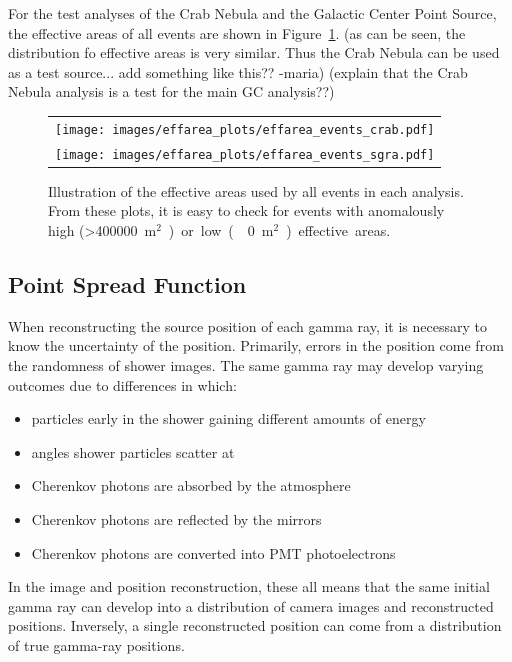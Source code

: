     For the test analyses of the Crab Nebula and the Galactic Center Point Source, the effective areas of all events are shown in Figure~\ref{fig:effarea_usage}.
    {\color{red}(as can be seen, the distribution fo effective areas is very similar. Thus the Crab Nebula can be used as a test source... add something like this?? -maria)}
    {\color{red}(explain that the Crab Nebula analysis is a test for the main GC analysis??)}

    \begin{figure}[!t]
      \centering
      \begin{tabular}{c}
        \texttt{[image: images/effarea\_plots/effarea\_events\_crab.pdf]} \\
        \texttt{[image: images/effarea\_plots/effarea\_events\_sgra.pdf]}
      \end{tabular}
      \caption[Effective Areas Used]{
      Illustration of the effective areas used by all events in each analysis.
      From these plots, it is easy to check for events with anomalously high (>\SI{400000}{m${}^2$}) or low (\nicetilde\SI{0}{m${}^2$}) effective areas.
      }
      \label{fig:effarea_usage}
    \end{figure}
  
  \FloatBarrier

  \subsection{Point Spread Function}\label{subsec:psf}

    When reconstructing the source position of each gamma ray, it is necessary to know the uncertainty of the position.
    Primarily, errors in the position come from the randomness of shower images.
    The same gamma ray may develop varying outcomes due to differences in which:
    \begin{itemize}[label=$\bullet$,noitemsep]
      \item particles early in the shower gaining different amounts of energy
      \item angles shower particles scatter at
      \item Cherenkov photons are absorbed by the atmosphere
      \item Cherenkov photons are reflected by the mirrors
      \item Cherenkov photons are converted into PMT photoelectrons
    \end{itemize}
    In the image and position reconstruction, these all means that the same initial gamma ray can develop into a distribution of camera images and reconstructed positions.
    Inversely, a single reconstructed position can come from a distribution of true gamma-ray positions.

